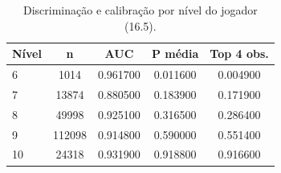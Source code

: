 \begin{table}[htbp]
\caption{Discriminação e calibração por nível do jogador (16.5).}
\label{tab:errlvl}
\centering
\small
\begin{tabular}{lcccc}
\toprule
Nível & n & AUC & P média & Top 4 obs. \\
\midrule
6 & 1014 & 0.961700 & 0.011600 & 0.004900 \\
7 & 13874 & 0.880500 & 0.183900 & 0.171900 \\
8 & 49998 & 0.925100 & 0.316500 & 0.286400 \\
9 & 112098 & 0.914800 & 0.590000 & 0.551400 \\
10 & 24318 & 0.931900 & 0.918800 & 0.916600 \\
\bottomrule
\end{tabular}
\end{table}
